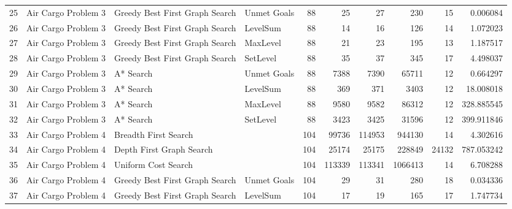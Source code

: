 \begin{tabular}{llllrrrrrr}
25 &  Air Cargo Problem 3 &  Greedy Best First Graph Search &  Unmet Goals &       88 &          25 &          27 &        230 &           15 &     0.006084 \\
26 &  Air Cargo Problem 3 &  Greedy Best First Graph Search &     LevelSum &       88 &          14 &          16 &        126 &           14 &     1.072023 \\
27 &  Air Cargo Problem 3 &  Greedy Best First Graph Search &     MaxLevel &       88 &          21 &          23 &        195 &           13 &     1.187517 \\
28 &  Air Cargo Problem 3 &  Greedy Best First Graph Search &     SetLevel &       88 &          35 &          37 &        345 &           17 &     4.498037 \\
29 &  Air Cargo Problem 3 &                       A* Search &  Unmet Goals &       88 &        7388 &        7390 &      65711 &           12 &     0.664297 \\
30 &  Air Cargo Problem 3 &                       A* Search &     LevelSum &       88 &         369 &         371 &       3403 &           12 &    18.008018 \\
31 &  Air Cargo Problem 3 &                       A* Search &     MaxLevel &       88 &        9580 &        9582 &      86312 &           12 &   328.885545 \\
32 &  Air Cargo Problem 3 &                       A* Search &     SetLevel &       88 &        3423 &        3425 &      31596 &           12 &   399.911846 \\
33 &  Air Cargo Problem 4 &            Breadth First Search &              &      104 &       99736 &      114953 &     944130 &           14 &     4.302616 \\
34 &  Air Cargo Problem 4 &        Depth First Graph Search &              &      104 &       25174 &       25175 &     228849 &        24132 &   787.053242 \\
35 &  Air Cargo Problem 4 &             Uniform Cost Search &              &      104 &      113339 &      113341 &    1066413 &           14 &     6.708288 \\
36 &  Air Cargo Problem 4 &  Greedy Best First Graph Search &  Unmet Goals &      104 &          29 &          31 &        280 &           18 &     0.034336 \\
37 &  Air Cargo Problem 4 &  Greedy Best First Graph Search &     LevelSum &      104 &          17 &          19 &        165 &           17 &     1.747734 \\

\end{tabular}
